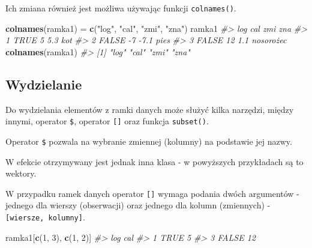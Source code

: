 \documentclass[paper=6in:9in,pagesize=pdftex,headinclude=on,footinclude=on,10pt]{scrbook}
\newenvironment{Shaded}{\begin{snugshade}}{\end{snugshade}}
\newcommand{\CommentTok}[1]{\textcolor[rgb]{0.56,0.35,0.01}{\textit{#1}}}
\newcommand{\DecValTok}[1]{\textcolor[rgb]{0.00,0.00,0.81}{#1}}
\newcommand{\KeywordTok}[1]{\textcolor[rgb]{0.13,0.29,0.53}{\textbf{#1}}}
\newcommand{\NormalTok}[1]{#1}
\newcommand{\OperatorTok}[1]{\textcolor[rgb]{0.81,0.36,0.00}{\textbf{#1}}}
\newcommand{\StringTok}[1]{\textcolor[rgb]{0.31,0.60,0.02}{#1}}
\begin{document}
Ich zmiana również jest możliwa używając funkcji \texttt{colnames()}.

\begin{Shaded}
\begin{Highlighting}[]
\KeywordTok{colnames}\NormalTok{(ramka1) =}\StringTok{ }\KeywordTok{c}\NormalTok{(}\StringTok{"log"}\NormalTok{, }\StringTok{"cal"}\NormalTok{, }\StringTok{"zmi"}\NormalTok{, }\StringTok{"zna"}\NormalTok{)}
\NormalTok{ramka1}
\CommentTok{#>     log cal  zmi       zna}
\CommentTok{#> 1  TRUE   5  5.3       kot}
\CommentTok{#> 2 FALSE  -7 -7.1      pies}
\CommentTok{#> 3 FALSE  12  1.1 nosorożec}
\KeywordTok{colnames}\NormalTok{(ramka1)}
\CommentTok{#> [1] "log" "cal" "zmi" "zna"}
\end{Highlighting}
\end{Shaded}

\hypertarget{wydzielanie-df}{%
\subsection{Wydzielanie}\label{wydzielanie-df}}

Do wydzielania elementów z ramki danych może służyć kilka narzędzi, między innymi, operator \texttt{\$}, operator \texttt{{[}{]}} oraz funkcja \texttt{subset()}.

Operator \texttt{\$} pozwala na wybranie zmiennej (kolumny) na podstawie jej nazwy.

\begin{Shaded}
\end{Shaded}

W efekcie otrzymywany jest jednak inna klasa - w powyższych przykładach są to wektory.

W przypadku ramek danych operator \texttt{{[}{]}} wymaga podania dwóch argumentów - jednego dla wierszy (obserwacji) oraz jednego dla kolumn (zmiennych) - \texttt{{[}wiersze,\ kolumny{]}}.

\begin{Shaded}
\begin{Highlighting}[]
\NormalTok{ramka1[}\KeywordTok{c}\NormalTok{(}\DecValTok{1}\NormalTok{, }\DecValTok{3}\NormalTok{), }\KeywordTok{c}\NormalTok{(}\DecValTok{1}\NormalTok{, }\DecValTok{2}\NormalTok{)]}
\CommentTok{#>     log cal}
\CommentTok{#> 1  TRUE   5}
\CommentTok{#> 3 FALSE  12}
\end{Highlighting}
\end{Shaded}
\end{document}
